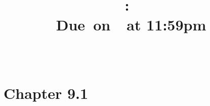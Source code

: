 \documentclass{article}
\title{
	\vspace{2in}
	\textmd{\textbf{\hmwkClass:\ \hmwkTitle}}\\
	\normalsize\vspace{0.1in}\small{Due\ on\ \hmwkDueDate\ at 11:59pm}\\
	\vspace{0.1in}\large{\textit{\hmwkClassInstructor\ \hmwkClassTime}}
	\vspace{3in}
}
\author{\hmwkAuthorName}
\date{}
\begin{document}
	\maketitle
	
	\pagebreak
	
	
	\section{Chapter 9.1}
	
	
\end{document}

